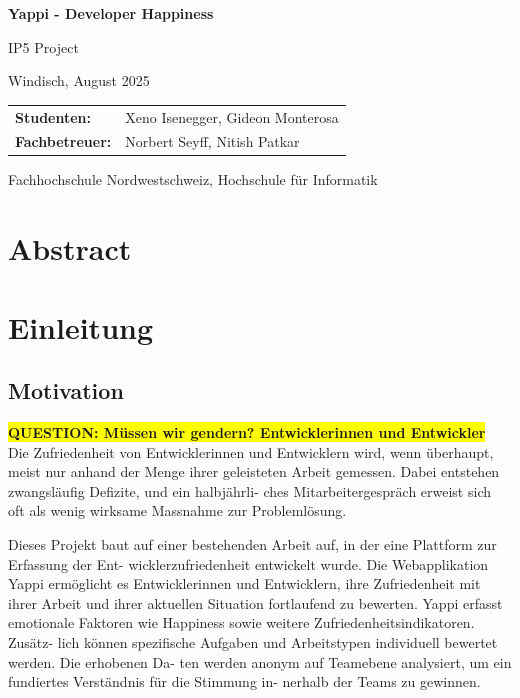 \documentclass[12pt,a4paper]{report}
\newcommand{\question}[1]{\colorbox{yellow}{\textbf{QUESTION: #1}}\\}
\begin{document}
\begin{titlepage}
  \centering
  {\huge \textbf{Yappi - Developer Happiness} \par}
  {\large IP5 Project \par}
  \vspace{0.5cm}
  {Windisch, August 2025 \par}
  \vspace{0.5cm}

  \begin{tabular}{@{}ll@{}}
    \textbf{Studenten:}    & Xeno Isenegger, Gideon Monterosa \\
    \textbf{Fachbetreuer:} & Norbert Seyff, Nitish Patkar
  \end{tabular}

  \vfill
  {Fachhochschule Nordwestschweiz, Hochschule für Informatik \par}
\end{titlepage}

\chapter*{Abstract}
\newpage

\tableofcontents
\newpage

\listoffigures
\newpage

\listoftables
\newpage

\chapter{Einleitung}

\section{Motivation}
\question{Müssen wir gendern? Entwicklerinnen und Entwickler}

Die Zufriedenheit von Entwicklerinnen und Entwicklern wird, wenn überhaupt, meist nur anhand der
Menge ihrer geleisteten Arbeit gemessen. Dabei entstehen zwangsläufig Defizite, und ein halbjährli-
ches Mitarbeitergespräch erweist sich oft als wenig wirksame Massnahme zur Problemlösung.

Dieses Projekt baut auf einer bestehenden Arbeit auf, in der eine Plattform zur Erfassung der Ent-
wicklerzufriedenheit entwickelt wurde. Die Webapplikation Yappi ermöglicht es Entwicklerinnen und
Entwicklern, ihre Zufriedenheit mit ihrer Arbeit und ihrer aktuellen Situation fortlaufend zu bewerten.
Yappi erfasst emotionale Faktoren wie Happiness sowie weitere Zufriedenheitsindikatoren. Zusätz-
lich können spezifische Aufgaben und Arbeitstypen individuell bewertet werden. Die erhobenen Da-
ten werden anonym auf Teamebene analysiert, um ein fundiertes Verständnis für die Stimmung in-
nerhalb der Teams zu gewinnen.
\end{document}
